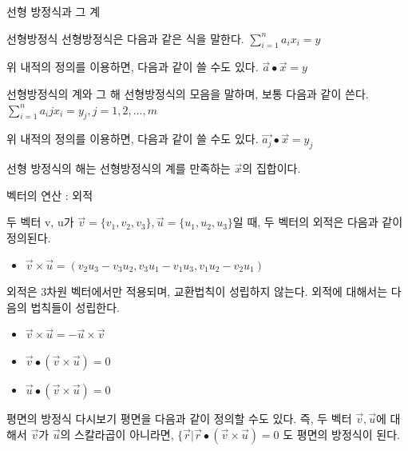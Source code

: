 \documentclass{beamer}
\begin{document}
\begin{frame}{선형 방정식과 그 계} 

\begin{block}{선형방정식}
선형방정식은 다음과 같은 식을 말한다. $\sum^{n}_{i=1} a_i x_i = y$ 

위 내적의 정의를 이용하면, 다음과 같이 쓸 수도 있다. $ \vec{a} \bullet \vec{x} = y$
\end{block}

\begin{block}{선형방정식의 계와 그 해 }
선형방정식의 모음을 말하며, 보통 다음과 같이 쓴다. $\sum^{n}_{i=1} a_ij x_i = y_j, j=1,2, ... ,m $ 

위 내적의 정의를 이용하면, 다음과 같이 쓸 수도 있다. $ \vec{a_j} \bullet \vec{x} = y_j$

선형 방정식의 해는 선형방정식의 계를 만족하는 $\vec{x}$의 집합이다.
\end{block}

\end{frame}

\begin{frame}{벡터의 연산 : 외적 } 

두 벡터 v, u가 $\vec{v} = \{v_1, v_2, v_3\}, \vec{u} = \{u_1, u_2, u_3\}$일 때, 두 벡터의 외적은 다음과 같이 정의된다. 
\begin{itemize} 
\item $\vec{v} \times \vec{u} = (v_2u_3 - v_3u_2, v_3u_1 - v_1u_3, v_1u_2 - v_2u_1) $
\end{itemize}

외적은 3차원 벡터에서만 적용되며, 교환법칙이 성립하지 않는다. 외적에 대해서는 다음의 법칙들이 성립한다. 

\begin{itemize} 
\item $\vec{v} \times \vec{u} = - \vec{u} \times \vec{v} $
\item $\vec{v} \bullet (\vec{v} \times \vec{u}) = 0 $
\item $\vec{u} \bullet (\vec{v} \times \vec{u}) = 0 $
\end{itemize}
\end{frame}


\begin{frame}{평면의 방정식 다시보기} 
평면을 다음과 같이 정의할 수도 있다. 즉, 두 벡터 $\vec{v}, \vec{u}$에 대해서 $\vec{v}$가 $\vec{u}$의 스칼라곱이 아니라면, $\{\vec{r}|\vec{r} \bullet (\vec{v} \times \vec{u}) = 0$ 도 평면의 방정식이 된다. 
\end{frame}
\end{document}
